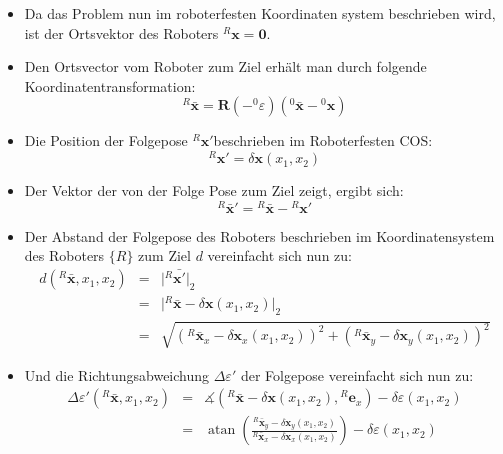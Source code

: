 \documentclass[10pt,a4paper]{article}
\DeclareMathOperator{\atan}{atan}
\begin{document}
\begin{itemize}
	\item Da das Problem nun im roboterfesten Koordinaten system beschrieben wird, ist der Ortsvektor des Roboters $^R\bm{x} = \bm{0}$.
	\item Den Ortsvector vom Roboter zum Ziel erhält man durch folgende Koordinatentransformation:
	\begin{equation}
	^R\bar{\bm{x}} = \bm{R}(-{^0}\varepsilon)({^0}\bm{\bar{\bm{x}}}-{^0}\bm{x})
	\end{equation}
	\item Die Position der Folgepose $^R\bm{x}'$beschrieben im Roboterfesten COS:
	\begin{equation}
	^R\bm{x}' = \delta \bm{x}(x_1, x_2)
	\end{equation}
	
	\item Der Vektor der von der Folge Pose zum Ziel zeigt, ergibt sich:
	\begin{equation}
		{^R}\bar{\bm{x}}' =  {^R}\bar{\bm{x}} - {^R}\bm{x}'
	\end{equation}	
	
	\item Der Abstand der Folgepose des Roboters beschrieben im Koordinatensystem des Roboters $\{R\}$ zum Ziel $d$ vereinfacht sich nun zu:
	\begin{eqnarray}
		d({^R}\bar{\bm{x}}, x_1, x_2) &=& \big| {^R}\bar{\bm{x}'}\big|_2 \\
		&=& \big| {^R}\bar{\bm{x}} - \delta \bm{x}(x_1, x_2) \big|_2 \\
		&=& \sqrt{ \left({^R}\bar{\bm{x}}_x - \delta \bm{x}_x(x_1, x_2) \right)^2 + \left({^R}\bar{\bm{x}}_y - \delta \bm{x}_y(x_1, x_2) \right)^2 }
	\end{eqnarray}

	\item Und die Richtungsabweichung $\Delta \varepsilon'$ der Folgepose vereinfacht sich nun zu:
	\begin{eqnarray}
	\Delta \varepsilon' ({^R}\bar{\bm{x}}, x_1, x_2) 
	&=& \measuredangle \left( {^R}\bar{\bm{x}} - \delta \bm{x}(x_1,x_2) , {^R}\bm{e}_x \right) - \delta\varepsilon(x_1,x_2) \\
	&=& \atan\left( \frac{{^R}\bar{\bm{x}}_y - \delta\bm{x}_y(x_1,x_2)}{{^R}\bar{\bm{x}}_x - \delta\bm{x}_x(x_1,x_2)}\right) - \delta\varepsilon(x_1,x_2)
	\end{eqnarray}

\end{itemize}
\end{document}
